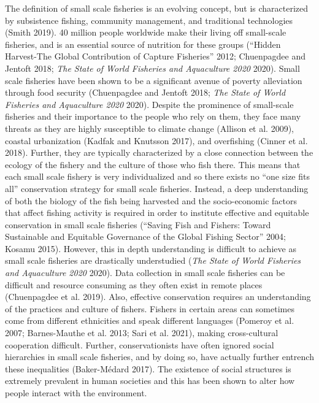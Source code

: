 \documentclass[
]{article}
\begin{document}
The definition of small scale fisheries is an evolving concept, but is characterized by subsistence fishing, community management, and traditional technologies (Smith 2019). 40 million people worldwide make their living off small-scale fisheries, and is an essential source of nutrition for these groups ({``Hidden {Harvest}-{The} {Global} {Contribution} of {Capture} {Fisheries}''} 2012; Chuenpagdee and Jentoft 2018; \emph{The {State} of {World} {Fisheries} and {Aquaculture} 2020} 2020). Small scale fisheries have been shown to be a significant avenue of poverty alleviation through food security (Chuenpagdee and Jentoft 2018; \emph{The {State} of {World} {Fisheries} and {Aquaculture} 2020} 2020). Despite the prominence of small-scale fisheries and their importance to the people who rely on them, they face many threats as they are highly susceptible to climate change (Allison et al. 2009), coastal urbanization (Kadfak and Knutsson 2017), and overfishing (Cinner et al. 2018). Further, they are typically characterized by a close connection between the ecology of the fishery and the culture of those who fish there. This means that each small scale fishery is very individualized and so there exists no ``one size fits all'' conservation strategy for small scale fisheries. Instead, a deep understanding of both the biology of the fish being harvested and the socio-economic factors that affect fishing activity is required in order to institute effective and equitable conservation in small scale fisheries ({``Saving {Fish} and {Fishers}: {Toward} {Sustainable} and {Equitable} {Governance} of the {Global} {Fishing} {Sector}''} 2004; Kosamu 2015).
However, this in depth understanding is difficult to achieve as small scale fisheries are drastically understudied (\emph{The {State} of {World} {Fisheries} and {Aquaculture} 2020} 2020). Data collection in small scale fisheries can be difficult and resource consuming as they often exist in remote places (Chuenpagdee et al. 2019). Also, effective conservation requires an understanding of the practices and culture of fishers. Fishers in certain areas can sometimes come from different ethnicities and speak different languages (Pomeroy et al. 2007; Barnes-Mauthe et al. 2013; Sari et al. 2021), making cross-cultural cooperation difficult. Further, conservationists have often ignored social hierarchies in small scale fisheries, and by doing so, have actually further entrench these inequalities (Baker-Médard 2017). The existence of social structures is extremely prevalent in human societies and this has been shown to alter how people interact with the environment.
\end{document}
